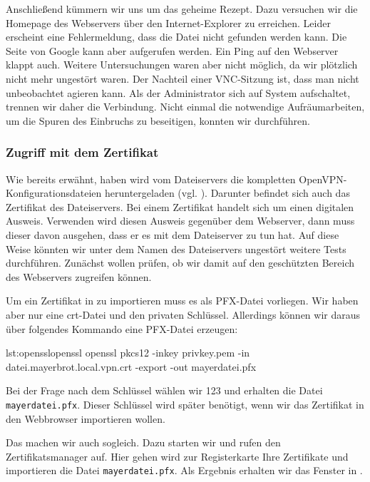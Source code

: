Anschließend kümmern wir uns um das geheime Rezept. Dazu versuchen wir die
Homepage des Webservers über den Internet-Explorer zu erreichen. Leider
erscheint eine Fehlermeldung, dass die Datei nicht gefunden werden kann. Die
Seite von Google kann aber aufgerufen werden. Ein Ping auf den Webserver klappt
auch. Weitere Untersuchungen waren aber nicht möglich, da wir plötzlich nicht
mehr ungestört waren. Der Nachteil einer VNC-Sitzung ist, dass man nicht
unbeobachtet agieren kann. Als der Administrator sich auf System aufschaltet,
trennen wir daher die Verbindung. Nicht einmal die notwendige Aufräumarbeiten,
um die Spuren des Einbruchs zu beseitigen, konnten wir durchführen.

\subsubsection{Zugriff mit dem Zertifikat}

Wie bereits erwähnt, haben wird vom Dateiservers die kompletten
OpenVPN-Konfigurationsdateien heruntergeladen
(vgl. ). Darunter befindet sich auch das Zertifikat
des Dateiservers. Bei einem Zertifikat handelt sich um einen digitalen
Ausweis. Verwenden wird diesen Ausweis gegenüber dem Webserver, dann muss dieser
davon ausgehen, dass er es mit dem Dateiserver zu tun hat. Auf diese Weise
könnten wir unter dem Namen des Dateiservers ungestört weitere Tests
durchführen. Zunächst wollen prüfen, ob wir damit auf den geschützten Bereich
des Webservers zugreifen können.


Um ein Zertifikat in \Firefox{} zu importieren muss es als PFX-Datei
vorliegen. Wir haben aber nur eine crt-Datei und den privaten
Schlüssel. Allerdings können wir daraus über folgendes Kommando eine PFX-Datei
erzeugen:

\begin{MetasploitCode}{lst:openssl}{openssl}
openssl pkcs12 -inkey privkey.pem -in datei.mayerbrot.local.vpn.crt -export -out mayerdatei.pfx
\end{MetasploitCode}

Bei der Frage nach dem Schlüssel wählen wir 123 und erhalten die Datei
\texttt{mayerdatei.pfx}. Dieser Schlüssel wird später benötigt, wenn wir das
Zertifikat in den Webbrowser importieren wollen.

Das machen wir auch sogleich. Dazu starten wir \Firefox{} und rufen den
Zertifikatsmanager auf. Hier gehen wird zur Registerkarte \glqq{}Ihre
Zertifikate\grqq{} und importieren die Datei \texttt{mayerdatei.pfx}. Als
Ergebnis erhalten wir das Fenster in .

